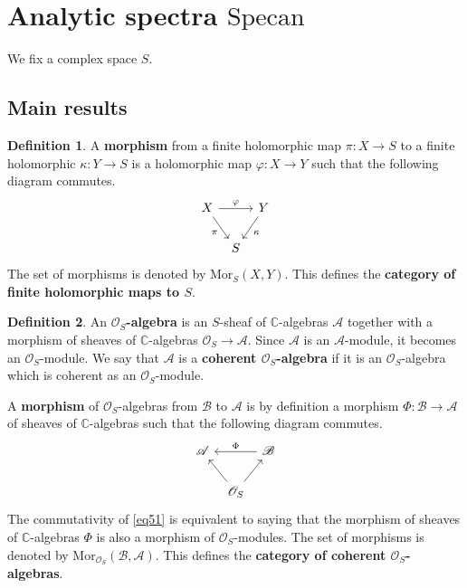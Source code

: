 \documentclass[12pt,b5paper,notitlepage]{report}
\theoremstyle{definition}
\newtheorem{df}{Definition}[section]
\theoremstyle{plain}
\newcommand{\scr}{\mathscr}
\newcommand{\Cbb}{\mathbb C}
\newcommand{\Specan}{\mathrm{Specan}}
\newcommand{\Mor}{\mathrm{Mor}}
\numberwithin{equation}{section}
\begin{document}
\section{Analytic spectra $\Specan$}

We fix a complex space $S$.

\subsection{Main results}



\begin{df}\label{lb228}
A \textbf{morphism} from a finite holomorphic map $\pi:X\rightarrow S$ to a finite holomorphic $\kappa:Y\rightarrow S$ is a holomorphic map $\varphi:X\rightarrow Y$ such that the following diagram commutes.
\begin{equation}\label{eq50}
\begin{tikzcd}[column sep=tiny]
X \arrow[rd,"\pi"'] \arrow[rr,"\varphi"] &   & Y \arrow[ld,"\kappa"] \\
                        & S &             
\end{tikzcd}
\end{equation}
The set of morphisms is denoted by $\Mor_S(X,Y)$. This defines the \textbf{category of finite holomorphic maps to $S$}.
\end{df}



\begin{df}
An \textbf{$\scr O_S$-algebra} is an $S$-sheaf of $\Cbb$-algebras $\scr A$ together with a morphism of sheaves of $\Cbb$-algebras $\scr O_S\rightarrow \scr A$. Since $\scr A$ is an $\scr A$-module, it becomes an $\scr O_S$-module. We say that $\scr A$ is a \textbf{coherent $\scr O_S$-algebra} if it is an $\scr O_S$-algebra which is coherent as an $\scr O_S$-module. 

A \textbf{morphism} of $\scr O_S$-algebras from $\scr B$ to $\scr A$ is by definition a morphism $\Phi:\scr B\rightarrow\scr A$ of sheaves of $\Cbb$-algebras such that the following diagram commutes.
\begin{equation}\label{eq51}
\begin{tikzcd}[column sep=tiny]
\scr A & & \scr B \arrow[ll,"\Phi"']\\
& \scr O_S \arrow[ul] \arrow[ru] &
\end{tikzcd}
\end{equation}
The commutativity of \eqref{eq51} is equivalent to saying that the morphism of sheaves of $\Cbb$-algebras $\Phi$ is also a morphism of $\scr O_S$-modules. The set of morphisms is denoted by $\Mor_{\scr O_S}(\scr B,\scr A)$. This defines the \textbf{category of coherent $\scr O_S$-algebras}. \hfill\qedsymbol
\end{df}
\end{document}
